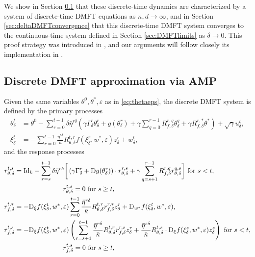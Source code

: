 \documentclass[11pt,letterpaper,reqno]{amsart}
\theoremstyle{definition}
\def\eps{\varepsilon}
\def\D{\mathrm{D}}
\def\Id{\mathrm{Id}}
\newcommand{\prn}[1]{\left({#1}\right)} %
\begin{document}
We show in Section \ref{sec:discreteDMFT} that
these discrete-time dynamics are characterized by a system of discrete-time
DMFT equations as $n,d \to \infty$, and in Section
\ref{sec:deltaDMFTconvergence} that this discrete-time DMFT system converges
to the continuous-time system defined in Section \ref{sec:DMFTlimits} as
$\delta \to 0$. This proof strategy was introduced in \cite{celentano2021high}, and our
arguments will follow closely its implementation in \cite{fan2025dynamical1}.

\subsection{Discrete DMFT approximation via AMP}\label{sec:discreteDMFT}

Given the same variables $\theta^0,\theta^*,\eps$ as in
\eqref{eq:thetaeps}, the discrete DMFT system is defined by the primary
processes
\begin{align}
\theta^t_\delta&=
\theta^0-\sum_{r=0}^{t-1} \delta\bar\eta^{r\delta}\prn{{\gamma}\Gamma_\delta^r \theta^r_\delta+g(\theta^r_\delta)+\gamma\sum_{q=0}^{r-1}R_{f,\delta}^{r,q}
\theta^q_\delta
+ {\gamma} R_{f,\delta}^{r,*}\theta^*}+\sqrt{\gamma}u_\delta^t,
\label{eq:def-dis-theta}\\
\xi^t_\delta&={-}\sum_{r=0}^{t-1}\frac{\bar\eta^{r\delta}}{\bar\kappa}
R_{\theta,\delta}^{t,r}f(\xi_\delta^r,w^*,\eps)z^r_\delta+w^t_\delta,\label{eq:def-dis-xi}
\end{align}
and the response processes
\begin{align}
r_{\theta,\delta}^{t,s}&=\Id_k
-\sum_{r=s}^{t-1} \delta\bar\eta^{r\delta}\bigg[\left({\gamma}\Gamma_\delta^r+
\D g(\theta_\delta^r)\right)\cdot r_{\theta,\delta}^{r,s}
+{\gamma} \sum_{q=s+1}^{r-1}  R_{f,\delta}^{r,q}
r_{\theta, \delta}^{q,s}\bigg] \text{ for } s<t,\notag\\
&\hspace{1in} r_{\theta,\delta}^{t,s}=0 \text{ for } s \geq t,\label{eq:def-dis-deriv-t}\\
r_{f,\delta}^{t,*}&={-}\D_\xi f(\xi^t_\delta,w^*,\eps) \sum_{r=0}^{t-1}
\frac{\bar\eta^{r\delta}}{\bar\kappa}
R_{\theta,\delta}^{t,r}r_{f,\delta}^{r,*}z^r_\delta
+\D_{w^*} f(\xi^t_\delta,w^*,\eps),\label{eq:def-dis-deriv-xi-star}\\
    r_{f,\delta}^{t,s}&=-\D_\xi
f(\xi_\delta^{t},w^*,\eps)\prn{\sum_{r=s+1}^{t-1}\frac{\bar\eta^{r\delta}}{\bar\kappa}
R_{\theta,\delta}^{t,r} r_{f,\delta}^{r,s}z^r_\delta +
\frac{\bar\eta^{s\delta}}{\bar\kappa} R_{\theta,\delta}^{t,s}\cdot\D_\xi
f(\xi_\delta^{s},w^*,\eps)z^s_\delta} \text{ for } s<t,\notag\\
&\hspace{1in}r_{f,\delta}^{t,s}=0 \text{ for } s \geq t,\label{eq:def-dis-deriv-xi}
\end{align}
\end{document}
